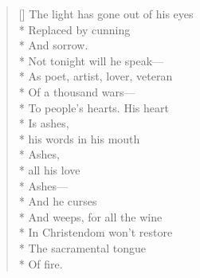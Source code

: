 \label{ch:drunk_poet}
\settowidth{\versewidth}{               his words in his mouth}
\begin{verse}[\versewidth]
The light has gone out of his eyes\\*
Replaced by cunning\\*
And sorrow.\\*
Not tonight will he speak---\\*
As poet, artist, lover, veteran\\*
Of a thousand wars---\\*
To people's hearts.   His heart\\*
Is ashes,\\*
               his words in his mouth\\*
Ashes, \\*
             all his love\\*
Ashes---\\*
 \qquad And he curses\\*
And weeps, for all the wine\\*
In Christendom won't restore\\*
The sacramental tongue\\*
Of fire.
\end{verse}
